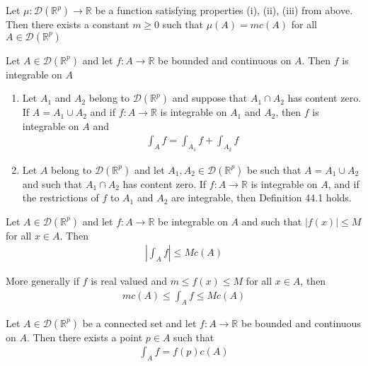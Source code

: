 \documentclass[12pt]{article}
\newcommand{\R}{\mathbb{R}}
\newenvironment{theorem}[2][Theorem]{\begin{trivlist}
\item[\hskip \labelsep {\bfseries #1}\hskip \labelsep {\bfseries #2.}]}{\end{trivlist}}
\newenvironment{corollary}[2][Corollary]{\begin{trivlist}
\item[\hskip \labelsep {\bfseries #1}\hskip \labelsep {\bfseries #2.}]}{\end{trivlist}}
\begin{document}
\begin{corollary}{44.7}
Let $\mu: \mathscr{D}(\R^p) \to \R$ be a function satisfying properties (i), (ii), (iii) from above. Then there exists a constant $m \geq 0$ such that $\mu(A) = mc(A)$ for all $A \in \mathscr{D}(\R^p)$
\end{corollary}

\begin{theorem}{44.8}
Let $A \in \mathscr{D}(\R^p)$ and let $f: A \to \R$ be bounded and continuous on $A$. Then $f$ is integrable on $A$
\end{theorem}

\begin{theorem}{44.9}
\begin{enumerate}[label=\alph*)]
\item Let $A_1$ and $A_2$ belong to $\mathscr{D}(\R^p)$ and suppose that $A_1 \cap A_2$ has content zero. If $A = A_1 \cup A_2$ and if $f: A \to \R$ is integrable on $A_1$ and $A_2$, then $f$ is integrable on $A$ and
\begin{align*}
\int_A f = \int_{A_1} f + \int_{A_2} f
\end{align*}
\item Let $A$ belong to $\mathscr{D}(\R^p)$ and let $A_1, A_2 \in \mathscr{D}(\R^p)$ be such that $A = A_1 \cup A_2$ and such that $A_1 \cap A_2$ has content zero. If $f: A \to \R$ is integrable on $A$, and if the restrictions of $f$ to $A_1$ and $A_2$ are integrable, then Definition 44.1 holds.
\end{enumerate}
\end{theorem}

\begin{theorem}{44.10}
Let $A \in \mathscr{D}(\R^p)$ and let $f: A \to \R$ be integrable on $A$ and such that $|f(x)| \leq M$ for all $x \in A$. Then
\begin{align*}
\left| \int_A f \right| \leq Mc(A)
\end{align*}

More generally if $f$ is real valued and $m \leq f(x) \leq M$ for all $x \in A$, then
\begin{align*}
mc(A) \leq \int_A f \leq Mc(A)
\end{align*}
\end{theorem}

\begin{theorem}[Mean Value]{Theorem 44.11}
Let $A \in \mathscr{D}(\R^p)$ be a connected set and let $f: A \to \R$ be bounded and continuous on $A$. Then there exists a point $p \in A$ such that
\begin{align*}
\int_A f = f(p) c(A)
\end{align*}
\end{theorem}
\end{document}
